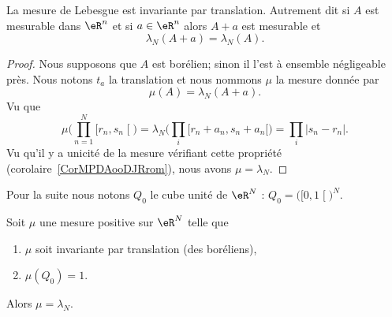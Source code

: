 \begin{theorem}        \label{THOooTMWHooThsDHj}
	La mesure de Lebesgue est invariante par translation. Autrement dit si \( A\) est mesurable dans \( \eR^n\) et si \( a\in \eR^n\) alors \( A+a\) est mesurable et
	\begin{equation}
		\lambda_N(A+a)=\lambda_N(A).
	\end{equation}
\end{theorem}

\begin{proof}
	Nous supposons que \( A\) est borélien; sinon il l'est à ensemble négligeable près. Nous notons \( t_a\) la translation et nous nommons \( \mu\) la mesure donnée par
	\begin{equation}
		\mu(A)=\lambda_N(A+a).
	\end{equation}
	Vu que
	\begin{equation}
		\mu\big( \prod_{n=1}^N\mathopen[ r_n , s_n \mathclose[ \big)=\lambda_N\big( \prod_i\mathopen[ r_n+a_n , s_n+a_n [ \big)=\prod_i| s_n-r_n |.
	\end{equation}
	Vu qu'il y a unicité de la mesure vérifiant cette propriété (corolaire~\ref{CorMPDAooDJRrom}), nous avons \( \mu=\lambda_N\).
\end{proof}

Pour la suite nous notons \( Q_0\) le cube unité de \( \eR^N\) : \( Q_0=\big( \mathopen[ 0 , 1 \mathclose[ \big)^N\).

\begin{theorem}        \label{ThoCABFooHbUzWc}
	Soit \( \mu\) une mesure positive sur \( \eR^N\) telle que
	\begin{enumerate}
		\item
		      \( \mu\) soit invariante par translation (des boréliens),
		\item
		      \( \mu(Q_0)=1\).
	\end{enumerate}
	Alors \( \mu=\lambda_N\).
\end{theorem}

